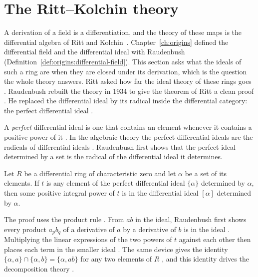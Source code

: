 \section{The Ritt--Kolchin theory}\label{sec:differential-algebra:ritt-kolchin}

A derivation of a field is a differentiation, and the theory of these maps is
the differential algebra of Ritt and Kolchin~\cite[p.~361]{Raudenbush1934}. Chapter~\ref{ch:origins} defined
the differential field and the
differential ideal with Raudenbush
(Definition~\ref{def:origins:differential-field}). This section asks what the
ideals of such a ring are when they are closed under its derivation, which is
the question the whole theory answers. Ritt asked how far the
ideal theory of these rings goes \cite[p.~361]{Raudenbush1934}.
Raudenbush rebuilt the theory in 1934 to give the theorem of Ritt a
clean proof \cite[p.~361]{Raudenbush1934}. He replaced the differential
ideal by its radical inside
the differential category: the perfect differential ideal
\cite[p.~361]{Raudenbush1934}.

A \emph{perfect} differential ideal is one that contains an element
whenever it contains a positive power of it
\cite[p.~362]{Raudenbush1934}. In the algebraic theory the perfect
differential ideals are the radicals of differential ideals
\cite[p.~362]{Raudenbush1934}. Raudenbush first shows that the perfect
ideal determined by a set is the radical of the differential ideal it
determines.

\begin{theorem}\label{thm:diffalg:perfect-is-radical}
Let $R$ be a differential ring of characteristic zero and let
$\alpha$ be a set of its elements. If $t$ is any element of the perfect
differential ideal $\{\alpha\}$ determined by $\alpha$, then some
positive integral power of $t$ is in the differential ideal $[\alpha]$
determined by $\alpha$.
\end{theorem}

The proof uses the product rule
\cite[p.~363]{Raudenbush1934}. From $ab$ in the ideal, Raudenbush first
shows every product $a_pb_q$ of a derivative of $a$ by a derivative of
$b$ is in the ideal \cite[p.~363]{Raudenbush1934}. Multiplying the
linear expressions of the two powers of $t$ against each other then
places each term in the smaller ideal \cite[p.~363]{Raudenbush1934}.
The same device gives the identity
$\{\alpha, a\}\cap\{\alpha,b\} = \{\alpha, ab\}$ for any two elements of
$R$ \cite[Theorem~2, p.~363]{Raudenbush1934}, and this identity drives
the decomposition theory \cite[p.~365]{Raudenbush1934}.

